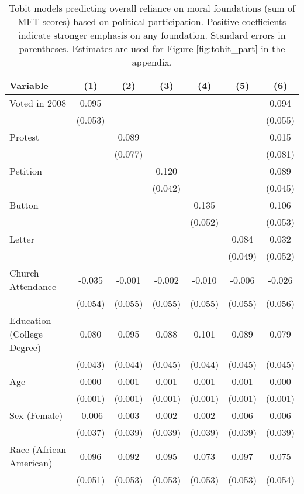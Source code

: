 \begin{table}[ht]
\centering
\caption{Tobit models predicting overall reliance on moral foundations
           (sum of MFT scores) based on political participation. Positive coefficients indicate 
           stronger emphasis on any foundation. Standard errors in parentheses. Estimates are 
           used for Figure \ref{fig:tobit_part} in the appendix.} 
\label{tab:tobit_part}
\begingroup\footnotesize
\begin{tabular}{lcccccc}
  \hline
Variable & (1) & (2) & (3) & (4) & (5) & (6) \\ 
  \hline
Voted in 2008 &  0.095 &  &  &  &  &  0.094 \\ 
   & (0.053) &  &  &  &  & (0.055) \\ 
  Protest &  &  0.089 &  &  &  &  0.015 \\ 
   &  & (0.077) &  &  &  & (0.081) \\ 
  Petition &  &  &  0.120 &  &  &  0.089 \\ 
   &  &  & (0.042) &  &  & (0.045) \\ 
  Button &  &  &  &  0.135 &  &  0.106 \\ 
   &  &  &  & (0.052) &  & (0.053) \\ 
  Letter &  &  &  &  &  0.084 &  0.032 \\ 
   &  &  &  &  & (0.049) & (0.052) \\ 
  Church Attendance & -0.035 & -0.001 & -0.002 & -0.010 & -0.006 & -0.026 \\ 
   & (0.054) & (0.055) & (0.055) & (0.055) & (0.055) & (0.056) \\ 
  Education (College Degree) &  0.080 &  0.095 &  0.088 &  0.101 &  0.089 &  0.079 \\ 
   & (0.043) & (0.044) & (0.045) & (0.044) & (0.045) & (0.045) \\ 
  Age &  0.000 &  0.001 &  0.001 &  0.001 &  0.001 &  0.000 \\ 
   & (0.001) & (0.001) & (0.001) & (0.001) & (0.001) & (0.001) \\ 
  Sex (Female) & -0.006 &  0.003 &  0.002 &  0.002 &  0.006 &  0.006 \\ 
   & (0.037) & (0.039) & (0.039) & (0.039) & (0.039) & (0.039) \\ 
  Race (African American) &  0.096 &  0.092 &  0.095 &  0.073 &  0.097 &  0.075 \\ 
   & (0.051) & (0.053) & (0.053) & (0.053) & (0.053) & (0.054) \\ 

\end{tabular}
\end{table}
